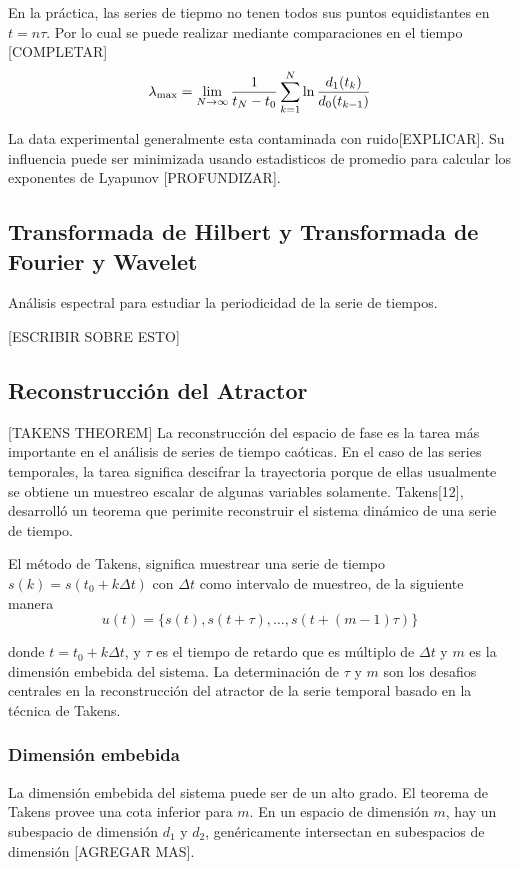 \documentclass[12pt]{book}
\begin{document}
En la práctica, las series de tiepmo no tenen todos sus puntos equidistantes en
$t=n\tau$. Por lo cual se puede realizar mediante comparaciones en el tiempo
[COMPLETAR]
$$
	\lambda_{\max} =
\lim_{N\rightarrow\infty}\frac{1}{t_N-t_0}\sum_{k=1}^{N}\ln\frac{d_1(t_k)}{d_0(t_{k-1})}
$$

La data experimental generalmente esta contaminada con ruido[EXPLICAR]. Su
influencia puede ser minimizada usando estadisticos de promedio para calcular
los exponentes de Lyapunov [PROFUNDIZAR].


\subsection{Transformada de Hilbert y Transformada de Fourier y Wavelet}
Análisis espectral para estudiar la periodicidad de la serie de tiempos. 

[ESCRIBIR SOBRE ESTO]

\subsection{Reconstrucción del Atractor}
[TAKENS THEOREM]
La reconstrucción del espacio de fase es la tarea más importante en el análisis
de series de tiempo caóticas.
En el caso de las series temporales, la tarea significa descifrar la
trayectoria porque de ellas usualmente se obtiene un muestreo escalar de algunas
variables solamente.
Takens[12], desarrolló un teorema que perimite reconstruir el sistema dinámico
de una serie de tiempo.

El método de Takens, significa muestrear una serie de tiempo $s(k) = s(t_0 +
k\Delta t)$ con $\Delta t$ como intervalo de muestreo, de la siguiente manera
$$
	u(t) = \{s(t), s(t + \tau), \ldots, s(t + (m-1)\tau) \}
$$

donde $t=t_0 + k\Delta t$, y $\tau$ es el tiempo de retardo que es múltiplo de
$\Delta t$ y $m$ es la dimensión embebida del sistema. 
La determinación de $\tau$ y $m$ son los desafios centrales en la reconstrucción
del atractor de la serie temporal basado en la técnica de Takens. 

\subsubsection{Dimensión embebida}
La dimensión embebida del sistema puede ser de un alto grado.
El teorema de Takens provee una cota inferior para $m$.
En un espacio de dimensión $m$, hay un subespacio de dimensión $d_1$ y $d_2$,
genéricamente intersectan en subespacios de dimensión [AGREGAR MAS].
\end{document}
